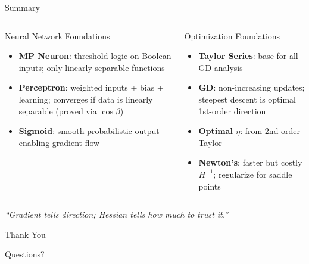 \documentclass{beamer}
\begin{document}
\begin{frame}{Summary}
  \begin{columns}
    \begin{block}{Neural Network Foundations}
      \begin{itemize}
        \item \textbf{MP Neuron}: threshold logic on Boolean inputs; only linearly separable functions
        \item \textbf{Perceptron}: weighted inputs + bias + learning; converges if data is linearly separable (proved via $\cos\beta$)
        \item \textbf{Sigmoid}: smooth probabilistic output enabling gradient flow
      \end{itemize}
    \end{block}
    \begin{block}{Optimization Foundations}
      \begin{itemize}
        \item \textbf{Taylor Series}: base for all GD analysis
        \item \textbf{GD}: non-increasing updates; steepest descent is optimal 1st-order direction
        \item \textbf{Optimal $\eta$}: from 2nd-order Taylor
        \item \textbf{Newton's}: faster but costly $H^{-1}$; regularize for saddle points
      \end{itemize}
    \end{block}
  \end{columns}
  \vspace{0.3cm}
  \begin{center}
    \large\textit{``Gradient tells direction; Hessian tells how much to trust it.''}
  \end{center}
\end{frame}

\begin{frame}
  \Huge{\centerline{Thank You}}
  \vspace{0.5cm}
  \large{\centerline{Questions?}}
\end{frame}
\end{document}
